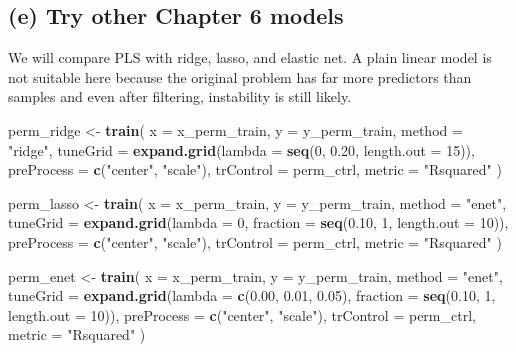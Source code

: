 \documentclass[
  11pt,
]{article}
\newenvironment{Shaded}{\begin{snugshade}}{\end{snugshade}}
\newcommand{\AttributeTok}[1]{\textcolor[rgb]{0.13,0.29,0.53}{#1}}
\newcommand{\DecValTok}[1]{\textcolor[rgb]{0.00,0.00,0.81}{#1}}
\newcommand{\FloatTok}[1]{\textcolor[rgb]{0.00,0.00,0.81}{#1}}
\newcommand{\FunctionTok}[1]{\textcolor[rgb]{0.13,0.29,0.53}{\textbf{#1}}}
\newcommand{\NormalTok}[1]{#1}
\newcommand{\OtherTok}[1]{\textcolor[rgb]{0.56,0.35,0.01}{#1}}
\newcommand{\StringTok}[1]{\textcolor[rgb]{0.31,0.60,0.02}{#1}}
\begin{document}
\subsection{(e) Try other Chapter 6
models}\label{e-try-other-chapter-6-models}

We will compare PLS with ridge, lasso, and elastic net. A plain linear
model is not suitable here because the original problem has far more
predictors than samples and even after filtering, instability is still
likely.

\begin{Shaded}
\begin{Highlighting}[]
\NormalTok{perm\_ridge }\OtherTok{\textless{}{-}} \FunctionTok{train}\NormalTok{(}
  \AttributeTok{x =}\NormalTok{ x\_perm\_train,}
  \AttributeTok{y =}\NormalTok{ y\_perm\_train,}
  \AttributeTok{method =} \StringTok{"ridge"}\NormalTok{,}
  \AttributeTok{tuneGrid =} \FunctionTok{expand.grid}\NormalTok{(}\AttributeTok{lambda =} \FunctionTok{seq}\NormalTok{(}\DecValTok{0}\NormalTok{, }\FloatTok{0.20}\NormalTok{, }\AttributeTok{length.out =} \DecValTok{15}\NormalTok{)),}
  \AttributeTok{preProcess =} \FunctionTok{c}\NormalTok{(}\StringTok{"center"}\NormalTok{, }\StringTok{"scale"}\NormalTok{),}
  \AttributeTok{trControl =}\NormalTok{ perm\_ctrl,}
  \AttributeTok{metric =} \StringTok{"Rsquared"}
\NormalTok{)}

\NormalTok{perm\_lasso }\OtherTok{\textless{}{-}} \FunctionTok{train}\NormalTok{(}
  \AttributeTok{x =}\NormalTok{ x\_perm\_train,}
  \AttributeTok{y =}\NormalTok{ y\_perm\_train,}
  \AttributeTok{method =} \StringTok{"enet"}\NormalTok{,}
  \AttributeTok{tuneGrid =} \FunctionTok{expand.grid}\NormalTok{(}\AttributeTok{lambda =} \DecValTok{0}\NormalTok{, }\AttributeTok{fraction =} \FunctionTok{seq}\NormalTok{(}\FloatTok{0.10}\NormalTok{, }\DecValTok{1}\NormalTok{, }\AttributeTok{length.out =} \DecValTok{10}\NormalTok{)),}
  \AttributeTok{preProcess =} \FunctionTok{c}\NormalTok{(}\StringTok{"center"}\NormalTok{, }\StringTok{"scale"}\NormalTok{),}
  \AttributeTok{trControl =}\NormalTok{ perm\_ctrl,}
  \AttributeTok{metric =} \StringTok{"Rsquared"}
\NormalTok{)}

\NormalTok{perm\_enet }\OtherTok{\textless{}{-}} \FunctionTok{train}\NormalTok{(}
  \AttributeTok{x =}\NormalTok{ x\_perm\_train,}
  \AttributeTok{y =}\NormalTok{ y\_perm\_train,}
  \AttributeTok{method =} \StringTok{"enet"}\NormalTok{,}
  \AttributeTok{tuneGrid =} \FunctionTok{expand.grid}\NormalTok{(}\AttributeTok{lambda =} \FunctionTok{c}\NormalTok{(}\FloatTok{0.00}\NormalTok{, }\FloatTok{0.01}\NormalTok{, }\FloatTok{0.05}\NormalTok{), }\AttributeTok{fraction =} \FunctionTok{seq}\NormalTok{(}\FloatTok{0.10}\NormalTok{, }\DecValTok{1}\NormalTok{, }\AttributeTok{length.out =} \DecValTok{10}\NormalTok{)),}
  \AttributeTok{preProcess =} \FunctionTok{c}\NormalTok{(}\StringTok{"center"}\NormalTok{, }\StringTok{"scale"}\NormalTok{),}
  \AttributeTok{trControl =}\NormalTok{ perm\_ctrl,}
  \AttributeTok{metric =} \StringTok{"Rsquared"}
\NormalTok{)}


\end{Highlighting}
\end{Shaded}
\end{document}
